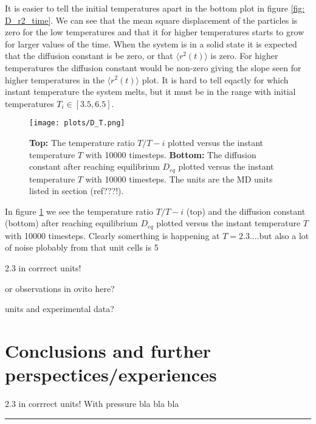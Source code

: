 \documentclass[11pt,a4wide]{article}
\begin{document}
It is easier to tell the initial temperatures apart in the bottom plot in figure \ref{fig: D_r2_time}. We can see that the mean square displacement of the particles is zero for the low temperatures and that it for higher temperatures starts to grow for larger values of the time. When the system is in a solid state it is expected that the diffusion constant is be zero, or that $\langle r^2(t) \rangle$ is zero. For higher temperatures the diffusion constant would be non-zero giving the slope seen for higher temperatures in the $\langle r^2(t) \rangle$ plot. It is hard to tell eqactly for which instant temperature the system melts, but it must be in the range with initial temperatures $T_i \in [3.5, 6.5]$.

\begin{figure}[htp]
\centering
\texttt{[image: plots/D\_T.png]}
\caption{\textbf{Top:} The temperature ratio $T/T-i$ plotted versus the instant temperature $T$ with 10000 timesteps. \textbf{Bottom:} The diffusion constant after reaching equilibrium $D_{eq}$ plotted versus the instant temperature $T$ with 10000 timesteps. The units are the MD units listed in section (ref???!).}
\label{fig: D_T}
\end{figure}

In figure \ref{fig: D_T} we see the temperature ratio $T/T-i$ (top) and the diffusion constant (bottom) after reaching equilibrium $D_{eq}$ plotted versus the instant temperature $T$ with 10000 timesteps. Clearly somerthing is happening at $T=2.3$....but also a lot of noise plobably from that unit cells is 5

2.3 in corrrect units!

or observations in ovito here?


units and experimental data?

\section{Conclusions and further perspectices/experiences}
2.3 in corrrect units! With pressure bla bla bla

\centering
\rule{0.3\textwidth}{0.4pt}\par %
\end{document}
